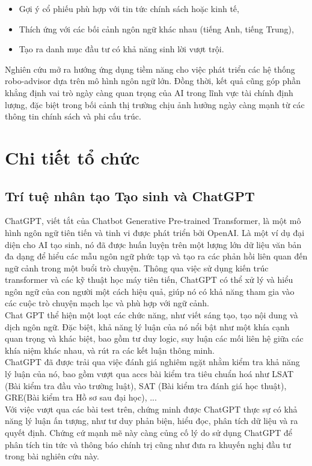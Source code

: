 \documentclass[a4paper,12pt]{article}
\begin{document}
\begin{itemize}
    \item Gợi ý cổ phiếu phù hợp với tin tức chính sách hoặc kinh tế,
    \item Thích ứng với các bối cảnh ngôn ngữ khác nhau (tiếng Anh, tiếng Trung),
    \item Tạo ra danh mục đầu tư có khả năng sinh lời vượt trội.
\end{itemize}
Nghiên cứu mở ra hướng ứng dụng tiềm năng cho việc phát triển các hệ thống robo-advisor dựa trên mô hình ngôn ngữ lớn. Đồng thời, kết quả cũng góp phần khẳng định vai trò ngày càng quan trọng của AI trong lĩnh vực tài chính định lượng, đặc biệt trong bối cảnh thị trường chịu ảnh hưởng ngày càng mạnh từ các thông tin chính sách và phi cấu trúc.

\section{Chi tiết tổ chức}
\subsection{Trí tuệ nhân tạo Tạo sinh và ChatGPT}
ChatGPT, viết tắt của Chatbot Generative Pre-trained Transformer, là một mô hình ngôn ngữ tiên tiến và tinh vi được phát triển bởi OpenAI. Là một ví dụ đại diện cho AI tạo sinh, nó đã được huấn luyện trên một lượng lớn dữ liệu văn bản đa dạng để hiểu các mẫu ngôn ngữ phức tạp và tạo ra các phản hồi liên quan đến ngữ cảnh trong một buổi trò chuyện. Thông qua việc sử dụng kiến trúc transformer và các kỹ thuật học máy tiên tiến, ChatGPT có thể xử lý và hiểu ngôn ngữ của con người một cách hiệu quả, giúp nó có khả năng tham gia vào các cuộc trò chuyện mạch lạc và phù hợp với ngữ cảnh.
\\ Chat GPT thể hiện một loạt các chức năng, như viết sáng tạo, tạo nội dung và dịch ngôn ngữ. Đặc biệt, khả năng lý luận của nó nổi bật như một khía cạnh quan trọng và khác biệt, bao gồm tư duy logic, suy luận các mối liên hệ giữa các khía niệm khác nhau, và rút ra các kết luận thông minh.
\\ ChatGPT đã được trải qua việc đánh giá nghiêm ngặt nhằm kiểm tra khả năng lý luận của nó, bao gồm vượt qua accs bài kiểm tra tiêu chuẩn hoá như LSAT (Bài kiểm tra đầu vào trường luật), SAT (Bài kiểm tra đánh giá học thuật), GRE(Bài kiểm tra Hồ sơ sau đại học), ...
\\ Với việc vượt qua các bài test trên, chứng minh được ChatGPT thực sự có khả năng lý luận ấn tượng, như tư duy phản biện, hiểu đọc, phân tích dữ liệu và ra quyết định. Chứng cứ mạnh mẽ này càng củng cố lý do sử dụng ChatGPT để phân tích tin tức và thông báo chính trị cũng như đưa ra khuyến nghị đầu tư trong bài nghiên cứu này.
\end{document}
